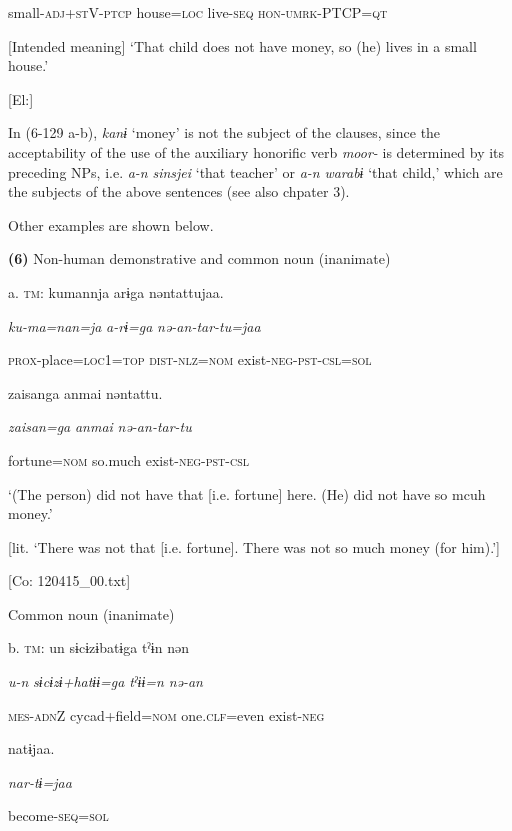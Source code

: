       small-\textsc{adj}+\textsc{st}V-\textsc{ptcp}  house=\textsc{loc}  live-\textsc{seq}  \textsc{hon}-\textsc{umrk}-PTCP=\textsc{qt}

      [Intended meaning] ‘That child does not have money, so (he) lives in a small house.’

      [El:]

In (6-129 a-b), \textit{kanɨ} ‘money’ is not the subject of the clauses, since the acceptability of the use of the auxiliary honorific verb \textit{moor-} is determined by its preceding NPs, i.e. \textit{a-n} \textit{sinsjei} ‘that teacher’ or \textit{a-n} \textit{warabɨ} ‘that child,’ which are the subjects of the above sentences (see also chpater 3).

Other examples are shown below.

\textbf{(6)}  Non-human demonstrative and common noun (inanimate)

  a.  \textsc{tm}:  kumannja  arɨga  nəntattujaa.

      \textit{ku-ma=nan=ja}  \textit{a-rɨ=ga}  \textit{nə-an-tar-tu=jaa}

      \textsc{prox}-place=\textsc{loc}1=\textsc{top}  \textsc{dist}-\textsc{nlz}=\textsc{nom}  exist-\textsc{neg}-\textsc{pst}-\textsc{csl}=\textsc{sol}

      {\textbar}zaisan{\textbar}ga  anmai  nəntattu.

      \textit{zaisan=ga}  \textit{anmai}  \textit{nə-an-tar-tu}

      fortune=\textsc{nom}  so.much  exist-\textsc{neg}-\textsc{pst}-\textsc{csl}

      ‘(The person) did not have that [i.e. fortune] here. (He) did not have so mcuh money.’

[lit. ‘There was not that [i.e. fortune]. There was not so much money (for him).’]

      [Co: 120415\_00.txt]

  Common noun (inanimate)

  b.  \textsc{tm}:  un  sɨcɨzɨbatɨga  tˀɨn  nən

      \textit{u-n}  \textit{sɨcɨzɨ+hatɨɨ=ga}  \textit{tˀɨɨ=n}  \textit{nə-an}

      \textsc{mes}-\textsc{adn}Z  cycad+field=\textsc{nom}  one.\textsc{clf}=even  exist-\textsc{neg}

      natɨjaa.

      \textit{nar-tɨ=jaa}

      become-\textsc{seq}=\textsc{sol}

